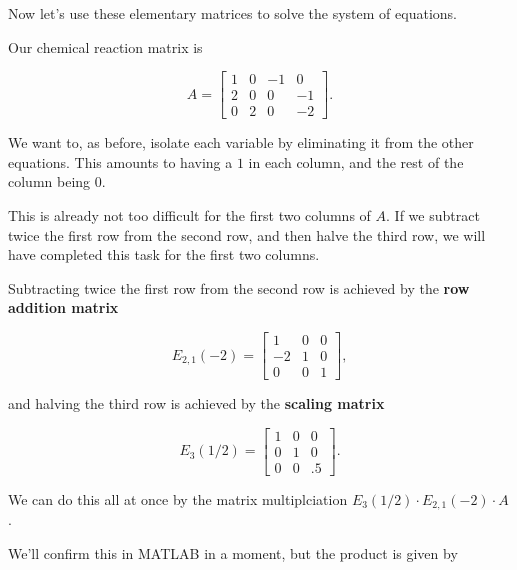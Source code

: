 \documentclass{ximera}
\begin{document}
\begin{exploration}
\begin{example}
\begin{remark}
\end{remark}

Now let's use these elementary matrices to solve the system of equations.

Our chemical reaction matrix is 

\begin{equation*}
  A = \begin{bmatrix}
    1 & 0 & -1 & 0 \\
    2 & 0 & 0 & -1 \\
    0 & 2 & 0 & -2
  \end{bmatrix}.
\end{equation*}

We want to, as before, isolate each variable by eliminating it from the other equations. This amounts to having a $1$ in each column, and the rest of the column being $0$.

This is already not too difficult for the first two columns of $A$. If we subtract twice the first row from the second row, and then halve the third row, we will have completed this task for the first two columns.

Subtracting twice the first row from the second row is achieved by the {\bf row addition matrix} 

$$E_{2,1}(-2)=\begin{bmatrix}1 & 0 & 0 \\ -2 & 1 & 0 \\ 0 & 0 & 1\end{bmatrix},$$

and halving the third row is achieved by the {\bf scaling matrix}

$$E_{3}(1/2)=\begin{bmatrix}1 & 0 & 0 \\ 0 & 1 & 0 \\ 0 & 0 & .5\end{bmatrix}.$$

We can do this all at once by the matrix multiplciation $E_{3}(1/2)\cdot E_{2,1}(-2)\cdot A$.

We'll confirm this in MATLAB in a moment, but the product is given by 


\end{example}
\end{exploration}
\end{document}
